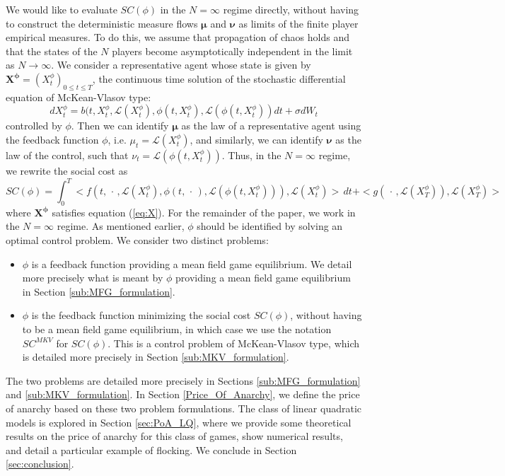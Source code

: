 \documentclass[11pt]{article}
\def\bmu{\boldsymbol{\mu}}
\def\bnu{\boldsymbol{\nu}}
\newcommand\cL{\mathcal L}
\begin{document}
We would like to evaluate $SC(\phi)$ in the $N=\infty$ regime directly, without having to construct the deterministic measure flows $\bmu$ and $\bnu$ as limits of the finite player empirical measures. To do this, we assume that propagation of chaos holds and that the states of the $N$ players become asymptotically independent in the limit as $N \rightarrow \infty$. We consider a representative agent whose state is given by $\boldsymbol{X^{\phi}}=(X^{\phi}_t)_{0 \leq t \leq T}$, the continuous time solution of the stochastic differential equation of McKean-Vlasov type:
\begin{equation}
    dX^{\phi}_t=b(t,X^{\phi}_t,\cL(X^{\phi}_t),\phi(t,X^{\phi}_t),\cL(\phi(t,X^{\phi}_t))dt+\sigma dW_t
\label{eq:X}
\end{equation}
controlled by $\phi$. Then we can identify $\bmu$ as the law of a representative agent using the feedback function $\phi$, i.e. $\mu_t=\cL(X^{\phi}_t)$, and similarly, we can identify $\bnu$ as the law of the control, such that $\nu_t=\cL(\phi(t,X^{\phi}_t))$. Thus, in the $N=\infty$ regime, we rewrite the social cost as
\begin{equation*}
SC(\phi)=\int_0^T<f(t,\,\cdot\,,\cL(X^{\phi}_t),\phi(t,\,\cdot\,),\cL(\phi(t,X^{\phi}_t))),\cL(X^{\phi}_t)>\,dt+<g(\,\cdot\,,\cL(X^{\phi}_T)),\cL(X^{\phi}_T)>
\end{equation*}
where $\boldsymbol{X^{\phi}}$ satisfies equation (\ref{eq:X}). For the remainder of the paper, we work in the $N=\infty$ regime. As mentioned earlier, $\phi$ should be identified by solving an optimal control problem. We consider two distinct problems:
\begin{itemize}\itemsep=-2pt
\item $\phi$ is a feedback function providing a mean field game equilibrium. We detail more precisely what is meant by $\phi$ providing a mean field game equilibrium in Section \ref{sub:MFG_formulation}.
\item $\phi$ is the feedback function minimizing the social cost $SC(\phi)$, without having to be a mean field game equilibrium, in which case we use the notation $SC^{MKV}$ for $SC(\phi)$. This is a control problem of McKean-Vlasov type, which is detailed more precisely in Section \ref{sub:MKV_formulation}.
\end{itemize}
The two problems are detailed more precisely in Sections \ref{sub:MFG_formulation} and \ref{sub:MKV_formulation}. In Section \ref{Price_Of_Anarchy}, we define the price of anarchy based on these two problem formulations. The class of linear quadratic models is explored in Section \ref{sec:PoA_LQ}, where we provide some theoretical results on the price of anarchy for this class of games, show numerical results, and detail a particular example of flocking. We conclude in Section \ref{sec:conclusion}.
\end{document}
